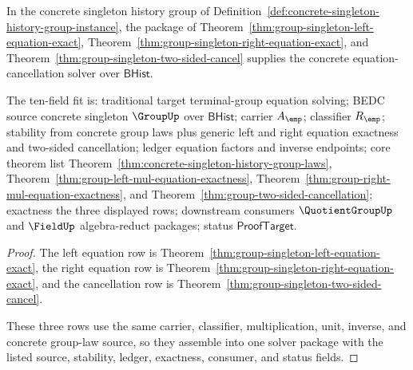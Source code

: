 \begin{theorem}
\label{thm:group-singleton-equation-cancellation-concrete-solver}
In the concrete singleton history group of
Definition~\ref{def:concrete-singleton-history-group-instance}, the package of
Theorem~\ref{thm:group-singleton-left-equation-exact},
Theorem~\ref{thm:group-singleton-right-equation-exact}, and
Theorem~\ref{thm:group-singleton-two-sided-cancel} supplies the concrete
equation-cancellation solver over $\mathsf{BHist}$.

The ten-field fit is: traditional target terminal-group equation solving;
BEDC source concrete singleton $\GroupUp$ over $\mathsf{BHist}$; carrier
$A_{\emp}$; classifier $R_{\emp}$; stability from concrete group laws plus
generic left and right equation exactness and two-sided cancellation; ledger
equation factors and inverse endpoints; core theorem list
Theorem~\ref{thm:concrete-singleton-history-group-laws},
Theorem~\ref{thm:group-left-mul-equation-exactness},
Theorem~\ref{thm:group-right-mul-equation-exactness}, and
Theorem~\ref{thm:group-two-sided-cancellation}; exactness the three displayed
rows; downstream consumers $\QuotientGroupUp$ and $\FieldUp$ algebra-reduct
packages; status $\mathsf{ProofTarget}$.
\end{theorem}
\begin{proof}
The left equation row is Theorem~\ref{thm:group-singleton-left-equation-exact},
the right equation row is Theorem~\ref{thm:group-singleton-right-equation-exact},
and the cancellation row is Theorem~\ref{thm:group-singleton-two-sided-cancel}.

These three rows use the same carrier, classifier, multiplication, unit, inverse,
and concrete group-law source, so they assemble into one solver package with the
listed source, stability, ledger, exactness, consumer, and status fields.
\end{proof}
